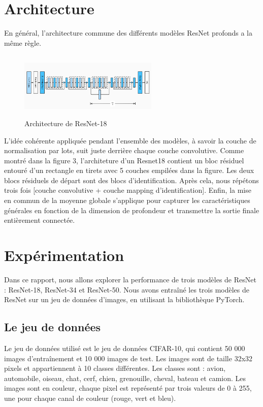 \documentclass{article}
\begin{document}
\section{Architecture}
En général, l'architecture commune des différents modèles ResNet profonds a la même règle.
\begin{figure}[t]
    \centering
    \includegraphics[width=250,height=120]{./img/model}
    \caption{Architecture de ResNet-18}
    \label{fig:}
\end{figure}
L'idée cohérente appliquée pendant l'ensemble des modèles, à savoir la couche de normalisation par lots, suit juste derrière chaque couche convolutive.
Comme montré dans la figure 3, l'architeture d'un Resnet18 contient un bloc résiduel entouré d'un rectangle en tirets avec 5 couches empilées dans la figure. Les deux blocs résiduels de départ sont des blocs d'identification. Après cela, nous répétons trois fois [couche convolutive + couche mapping d'identification]. Enfin, la mise en commun de la moyenne globale s'applique pour capturer les caractéristiques générales en fonction de la dimension de profondeur et transmettre la sortie finale entièrement connectée.

\section{Expérimentation}

Dans ce rapport, nous allons explorer la performance de trois modèles de ResNet : ResNet-18, ResNet-34 et ResNet-50. Nous avons entraîné les trois modèles de ResNet sur un jeu de données d'images, en utilisant la bibliothèque PyTorch.

\subsection{Le jeu de données}

Le jeu de données utilisé est le jeu de données CIFAR-10, qui contient 50 000 images d'entraînement et 10 000 images de test. Les images sont de taille 32x32 pixels et appartiennent à 10 classes différentes. Les classes sont : avion, automobile, oiseau, chat, cerf, chien, grenouille, cheval, bateau et camion. Les images sont en couleur, chaque pixel est représenté par trois valeurs de 0 à 255, une pour chaque canal de couleur (rouge, vert et bleu).
\end{document}

